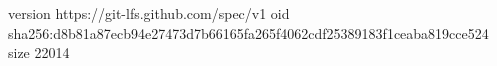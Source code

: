 version https://git-lfs.github.com/spec/v1
oid sha256:d8b81a87ecb94e27473d7b66165fa265f4062cdf25389183f1ceaba819cce524
size 22014

